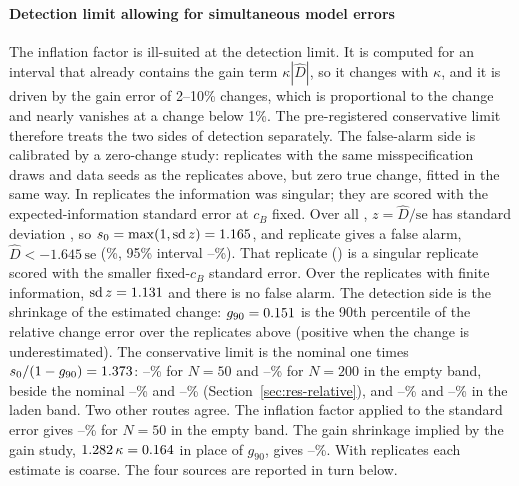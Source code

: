 \paragraph{Detection limit allowing for simultaneous model errors}\label{sec:res-cons-mdc}
The inflation factor is ill-suited at the detection limit. It is computed for an interval that already
contains the gain term $\kappa|\hat D|$, so it changes with $\kappa$, and it is driven by the gain error
of 2--10\% changes, which is proportional to the change and nearly vanishes at a change below 1\%. The
pre-registered conservative limit therefore treats the two sides of detection separately. The false-alarm
side is calibrated by a zero-change study: \ZeroN{} replicates with the same misspecification draws and
data seeds as the replicates above, but zero true change, fitted in the same way. In \ZeroNSing{}
replicates the information was singular; they are scored with the expected-information standard error at
$c_B$ fixed. Over all \ZeroN, $z=\hat D/\mathrm{se}$ has standard deviation \ZeroZsd{}, so
$s_0=\max(1,\mathrm{sd}\,z)=1.165$, and \ZeroFA{} replicate gives a false alarm, $\hat D<-1.645\,\mathrm{se}$
(\ZeroFAPct\%, 95\% interval \ZeroFALoPct--\ZeroFAHiPct\%). That replicate (\ZeroFAReps) is a singular
replicate scored with the smaller fixed-$c_B$ standard error. Over the \ZeroFiniteN{} replicates with
finite information, $\mathrm{sd}\,z=1.131$ and there is no false alarm. The detection side is the
shrinkage of the estimated change: $g_{90}=0.151$ is the 90th percentile of the relative change
error over the replicates above (positive when the change is underestimated). The conservative limit is
the nominal one times $s_0/(1-g_{90})=1.373$: \BandEmptyMDCFiftyConsMin--\BandEmptyMDCFiftyConsMax\%
for $N=50$ and \BandEmptyMDCTwoHundredConsMin--\BandEmptyMDCTwoHundredConsMax\% for $N=200$ in the empty
band, beside the nominal \BandEmptyMDCFiftyMin--\BandEmptyMDCFiftyMax\% and
\BandEmptyMDCTwoHundredMin--\BandEmptyMDCTwoHundredMax\% (Section~\ref{sec:res-relative}), and
\BandLadenMDCFiftyConsMin--\BandLadenMDCFiftyConsMax\% and
\BandLadenMDCTwoHundredConsMin--\BandLadenMDCTwoHundredConsMax\% in the laden band. Two other routes
agree. The inflation factor applied to the standard error gives
\BandEmptyMDCFiftyConsInflMin--\BandEmptyMDCFiftyConsInflMax\% for $N=50$ in the empty band. The gain
shrinkage implied by the gain study, $1.282\,\kappa=0.164$ in place of $g_{90}$, gives
\BandEmptyMDCFiftyConsGainMin--\BandEmptyMDCFiftyConsGainMax\%. With \ZeroN{} replicates each estimate is
coarse. The four sources are reported in turn below.


